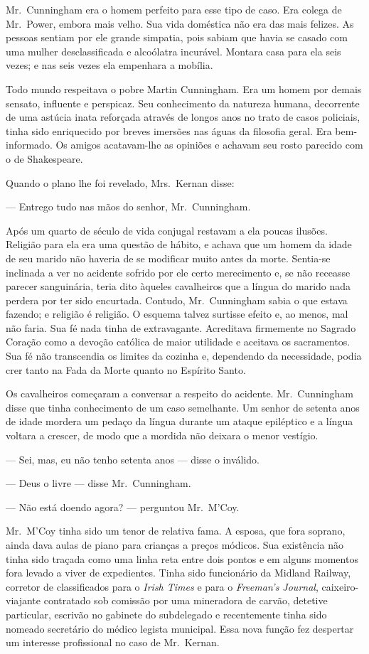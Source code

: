 Mr.~Cunningham era o homem perfeito para esse tipo de caso.  Era colega de 
Mr.~Power, embora mais velho.  Sua vida doméstica não era das mais felizes.  As
pessoas sentiam por ele grande simpatia, pois sabiam que havia se casado com
uma mulher desclassificada e alcoólatra incurável.  Montara casa para ela seis
vezes; e nas seis vezes ela empenhara a mobília.

Todo mundo respeitava o pobre Martin Cunningham.  Era um homem por demais
sensato, influente e perspicaz.  Seu conhecimento da natureza humana,
decorrente de uma astúcia inata reforçada através de longos anos no trato de
casos policiais, tinha sido enriquecido por breves imersões nas águas da
filosofia geral.  Era bem-informado.  Os amigos acatavam-lhe as opiniões e
achavam seu rosto parecido com o de Shakespeare.

Quando o plano lhe foi revelado, Mrs.~Kernan disse:

--- Entrego tudo nas mãos do senhor, Mr.~Cunningham.

Após um quarto de século de vida conjugal restavam a ela poucas ilusões.
Religião para ela era uma questão de hábito, e achava que um homem da idade de
seu marido não haveria de se modificar muito antes da morte.  Sentia-se
inclinada a ver no acidente sofrido por ele certo merecimento e, se não
receasse parecer sanguinária, teria dito àqueles cavalheiros que a língua do
marido nada perdera por ter sido encurtada.  Contudo, Mr.~Cunningham sabia o
que estava fazendo; e religião é religião.  O esquema talvez surtisse efeito e,
ao menos, mal não faria.  Sua fé nada tinha de extravagante.  Acreditava
firmemente no Sagrado Coração como a devoção católica de maior utilidade e
aceitava os sacramentos.  Sua fé não transcendia os limites da cozinha e,
dependendo da necessidade, podia crer tanto na Fada da Morte quanto no Espírito
Santo.

Os cavalheiros começaram a conversar a respeito do acidente.  Mr.~Cunningham
disse que tinha conhecimento de um caso semelhante.  Um senhor de setenta anos
de idade mordera um pedaço da língua durante um ataque epiléptico e a língua
voltara a crescer, de modo que a mordida não deixara o menor vestígio.

--- Sei, mas, eu não tenho setenta anos --- disse o inválido.

--- Deus o livre --- disse Mr.~Cunningham.

--- Não está doendo agora? --- perguntou Mr.~M’Coy.

Mr.~M’Coy tinha sido um tenor de relativa fama.  A esposa, que fora soprano,
ainda dava aulas de piano para crianças a preços módicos.  Sua existência não
tinha sido traçada como uma linha reta entre dois pontos e em alguns momentos
fora levado a viver de expedientes.  Tinha sido funcionário da Midland Railway,
corretor de classificados para o \textit{Irish Times} e para o
\textit{Freeman’s Journal}, caixeiro-viajante contratado sob comissão por uma
mineradora de carvão, detetive particular, escrivão no gabinete do subdelegado
e recentemente tinha sido nomeado secretário do médico legista municipal.  Essa
nova função fez despertar um interesse profissional no caso de Mr.~Kernan.

